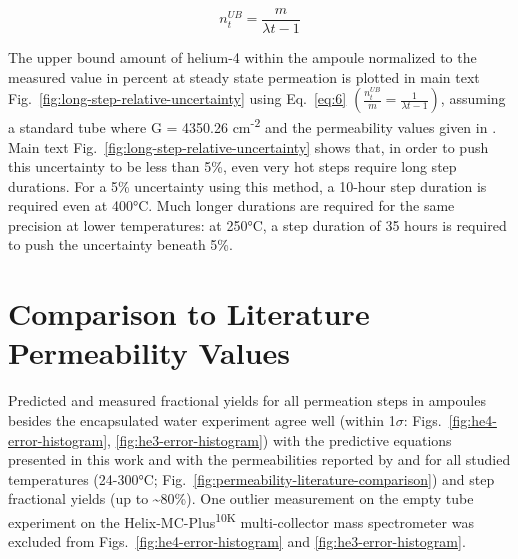 \begin{equation}
n_{t}^{UB} = \frac{m}{\lambda t - 1}
\label{eq:6}
\end{equation}

The upper bound amount of helium-4 within the ampoule normalized to the
measured value in percent at steady state permeation is plotted in
main text Fig.~\ref{fig:long-step-relative-uncertainty} using Eq.~\eqref{eq:6}
\(\left( \frac{n_{t}^{UB}}{m} = \frac{1}{\lambda t - 1} \right)\),
assuming a standard tube where G = 4350.26 cm\textsuperscript{-2} and
the permeability values given in \citet{swets1961}. Main text Fig.~\ref{fig:long-step-relative-uncertainty} shows
that, in order to push this uncertainty to be less than 5\%, even very
hot steps require long step durations. For a 5\% uncertainty using this
method, a 10-hour step duration is required even at 400°C. Much longer
durations are required for the same precision at lower temperatures: at
250°C, a step duration of 35 hours is required to push the uncertainty
beneath 5\%.

\section{Comparison to Literature Permeability Values}\label{comparison-to-literature-permeability-values}

Predicted and measured fractional yields for all permeation steps in ampoules besides the encapsulated water experiment agree well (within 1$\sigma$: Figs.~\ref{fig:he4-error-histogram}, \ref{fig:he3-error-histogram}) with the predictive equations presented in this work and with the permeabilities reported by \citet{swets1961} and \citet{jones1953} for all studied temperatures (24-300°C; Fig.~\ref{fig:permeability-literature-comparison}) and step fractional yields (up to \textasciitilde80\%). One outlier measurement on the empty tube experiment on the Helix-MC-Plus\textsuperscript{10K} multi-collector mass spectrometer was excluded from Figs.~\ref{fig:he4-error-histogram} and \ref{fig:he3-error-histogram}.

